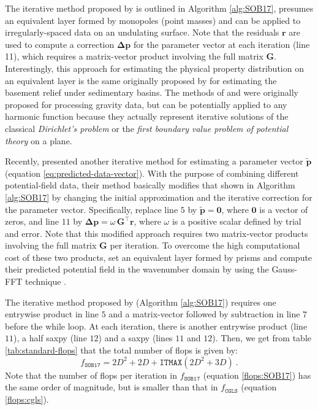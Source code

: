 The iterative method proposed by \citet{siqueira-etal2017} is outlined in Algorithm \ref{alg:SOB17},
presumes an equivalent layer formed by monopoles (point masses) and can be applied to
irregularly-spaced data on an undulating surface.
Note that the residuals $\mathbf{r}$ are used to compute a correction $\boldsymbol{\Delta}\mathbf{p}$
for the parameter vector at each iteration (line 11), which requires a matrix-vector product involving the 
full matrix $\mathbf{G}$.
Interestingly, this approach for estimating the physical property distribution on an equivalent layer 
is the same originally proposed by \citet{bott1960} for estimating the basement relief under sedimentary basins.
The methods of \citet{xia-sprowl1991} and \citet{siqueira-etal2017} were originally proposed for processing gravity data,
but can be potentially applied to any harmonic function because they actually represent iterative solutions of the 
classical \textit{Dirichlet’s problem} or the \textit{first boundary value problem of potential theory} 
\cite[][ p. 236]{kellogg1967} on a plane.

Recently, \citet{jirigalatu-ebbing2019} presented another iterative method for estimating a parameter 
vector $\tilde{\mathbf{p}}$ (equation \ref{eq:predicted-data-vector}). 
With the purpose of combining different potential-field data, 
their method basically modifies that shown in Algorithm \ref{alg:SOB17} by changing the initial approximation 
and the iterative correction for the parameter vector.
Specifically, \citet{jirigalatu-ebbing2019} replace line $5$ by $\tilde{\mathbf{p}} = \mathbf{0}$, where $\mathbf{0}$ is a vector of zeros,
and line $11$ by $\boldsymbol{\Delta}\mathbf{p} = \omega \, \mathbf{G}^{\top} \mathbf{r}$, where $\omega$ is a positive
scalar defined by trial and error.
Note that this modified approach requires two matrix-vector products involving the full matrix $\mathbf{G}$ per iteration.
To overcome the high computational cost of these two products, \citet{jirigalatu-ebbing2019} set an equivalent layer formed by
prisms and compute their predicted potential field in the wavenumber domain by using the Gauss-FFT technique
\cite{zhao-etal2018}.

The iterative method proposed by \citet{siqueira-etal2017} (Algorithm \ref{alg:SOB17}) requires one entrywise product in line $5$ and a matrix-vector followed by subtraction 
in line $7$ before the while loop. 
At each iteration, there is another entrywise product (line $11$), a half saxpy 
(line $12$) and a saxpy (lines $11$ and $12$). Then, we get from table \ref{tab:standard-flops} that the total number of flops is given by:
\begin{equation}
	f_{\mathtt{SOB17}} = 2D^{2} + 2D + \mathtt{ITMAX} \left( 2D^{2} + 3D \right) \: .
	\label{flops:SOB17}
\end{equation}
Note that the number of flops per iteration in $f_{\mathtt{SOB17}}$ (equation \ref{flops:SOB17}) has the same order of magnitude, but is smaller than that in
$f_{\mathtt{CGLS}}$ (equation \ref{flops:cgls}).

